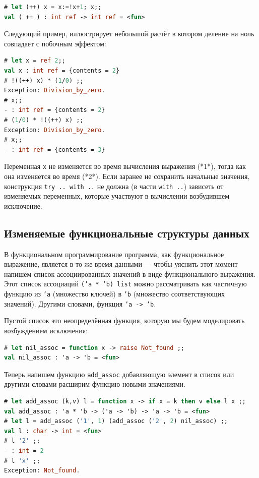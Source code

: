 \begin{lstlisting}[language=OCaml]
# let (++) x = x:=!x+1; x;;
val ( ++ ) : int ref -> int ref = <fun>
\end{lstlisting}

Следующий пример, иллюстрирует небольшой расчёт в котором деление на ноль
совпадает с побочным эффектом:

\begin{lstlisting}[language=OCaml]
# let x = ref 2;;
val x : int ref = {contents = 2}
# !((++) x) * (1/0) ;;
Exception: Division_by_zero.
# x;;
- : int ref = {contents = 2}
# (1/0) * !((++) x) ;;
Exception: Division_by_zero.
# x;;
- : int ref = {contents = 3}
\end{lstlisting}

Переменная \texttt{x} не изменяется во время вычисления выражения (*1*), тогда
как она изменяется во время (*2*). Если заранее не сохранить начальные значения,
конструкция \texttt{try .. with ..} не должна (в части \texttt{with ..})
зависеть от изменяемых переменных, которые участвуют в вычислении возбудившем
исключение.

\subsection{Изменяемые функциональные структуры данных}
\label{subsec:modifiable_functional_data_structures}

В функциональном программирование программа, как функциональное выражение,
является в то же время данными --- чтобы уяснить этот момент напишем список
ассоциированных значений в виде функционального выражения. Этот список
ассоциаций \texttt{('a * 'b) list} можно рассматривать как частичную функцию из
\texttt{'a} (множество ключей) в \texttt{'b} (множество соответствующих
значений). Другими словами, функция \texttt{'a -> 'b}.

Пустой список это неопределённая функция, которую мы будем моделировать
возбуждением исключения:

\begin{lstlisting}[language=OCaml]
# let nil_assoc = function x -> raise Not_found ;;
val nil_assoc : 'a -> 'b = <fun>
\end{lstlisting}

Теперь напишем функцию \texttt{add\_assoc} добавляющую элемент в список или
другими словами расширим функцию новыми значениями.

\begin{lstlisting}[language=OCaml]
# let add_assoc (k,v) l = function x -> if x = k then v else l x ;;
val add_assoc : 'a * 'b -> ('a -> 'b) -> 'a -> 'b = <fun>
# let l = add_assoc ('1', 1) (add_assoc ('2', 2) nil_assoc) ;;
val l : char -> int = <fun>
# l '2' ;;
- : int = 2
# l 'x' ;;
Exception: Not_found.
\end{lstlisting}

